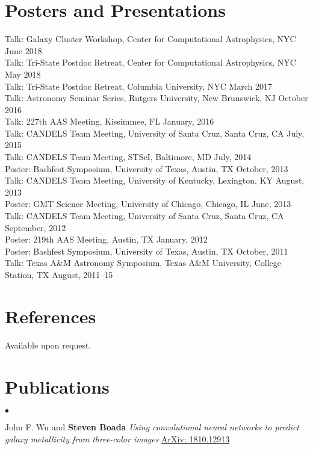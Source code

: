 \documentclass[margin,line, 11pt]{res}
\newenvironment{list2}{
  \begin{list}{$\bullet$}{%
      \setlength{\itemsep}{0in}
      \setlength{\parsep}{0in} \setlength{\parskip}{0in}
      \setlength{\topsep}{0in} \setlength{\partopsep}{0in}
      \setlength{\leftmargin}{0.2in}}}{\end{list}}
\begin{document}
\begin{resume}
\section{Posters and Presentations}
Talk: Galaxy Cluster Workshop, Center for Computational Astrophysics, NYC June 2018\\
Talk: Tri-State Postdoc Retreat, Center for Computational Astrophysics, NYC May 2018\\
Talk: Tri-State Postdoc Retreat, Columbia University, NYC March 2017\\
Talk: Astronomy Seminar Series, Rutgers University, New Brunswick, NJ October 2016\\
Talk: 227th AAS Meeting, Kissimmee, FL January, 2016\\
Talk: CANDELS Team Meeting, University of Santa Cruz, Santa Cruz, CA July, 2015\\
Talk: CANDELS Team Meeting, STScI, Baltimore, MD July, 2014\\
Poster: Bashfest Symposium, University of Texas, Austin, TX October, 2013\\
Talk: CANDELS Team Meeting, University of Kentucky, Lexington, KY August, 2013\\
Poster: GMT Science Meeting, University of Chicago, Chicago, IL June, 2013\\
Talk: CANDELS Team Meeting, University of Santa Cruz, Santa Cruz, CA September, 2012\\
Poster: 219th AAS Meeting, Austin, TX January, 2012\\
Poster: Bashfest Symposium, University of Texas, Austin, TX October, 2011\\
Talk: Texas A\&M Astronomy Symposium, Texas A\&M University, College Station, TX August, 2011--15\\

\section{References}
Available upon request.

\section{Publications}
\begin{list2}

\item John F. Wu and \textbf{Steven Boada} \emph{Using convolutional neural networks to predict galaxy metallicity from three-color images} \href{http://arxiv.org/abs/1810.12913}{ArXiv: 1810.12913}


\end{list2}
\end{resume}
\end{document}
